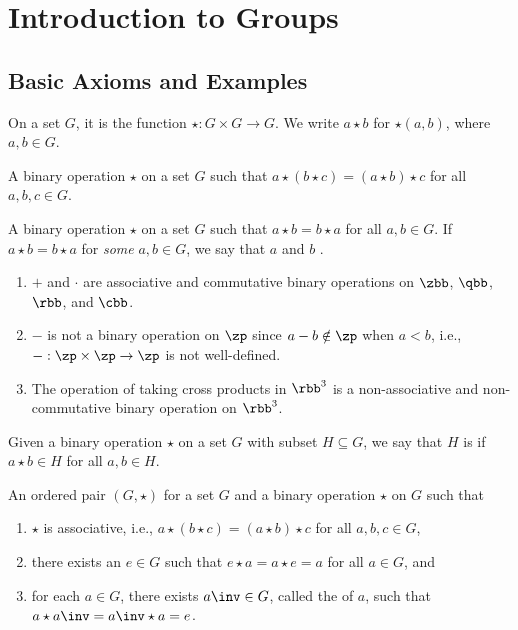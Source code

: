 \section{Introduction to Groups}

\subsection{Basic Axioms and Examples}

\begin{groupdef}
     On a set $G$, it is the function $\star : G \times G \to G$. We write $a \star b$ for $\star(a, b)$, where $a, b \in G$.

     A binary operation $\star$ on a set $G$ such that $a \star (b \star c) = (a \star b) \star c$ for all $a, b, c \in G$.

     A binary operation $\star$ on a set $G$ such that $a \star b = b \star a$ for all $a, b \in G$.
    If $a \star b = b \star a$ for \emph{some} $a, b \in G$, we say that $a$ and $b$ .
\end{groupdef}

\begin{example}
    \begin{enumerate}
        \item $+$ and $\cdot$ are associative and commutative binary operations on $\zbb$, $\qbb$, $\rbb$, and $\cbb$.
        \item $-$ is not a binary operation on $\zp$ since $a - b \notin \zp$ when $a < b$, i.e., $- : \zp \times \zp \to \zp$ is not well-defined.
        \item The operation of taking cross products in $\rbb^3$ is a non-associative and non-commutative binary operation on $\rbb^3$.
    \end{enumerate}
\end{example}

 Given a binary operation $\star$ on a set $G$ with subset $H \subseteq G$, we say that $H$ is  if $a \star b \in H$ for all $a, b \in H$.

 An ordered pair $(G, \star)$ for a set $G$ and a binary operation $\star$ on $G$ such that
\begin{enumerate}
    \item $\star$ is associative, i.e., $a \star (b \star c) = (a \star b) \star c$ for all $a, b, c \in G$,
    \item there exists an  $e \in G$ such that $e \star a = a \star e = a$ for all $a \in G$, and
    \item for each $a \in G$, there exists $a\inv \in G$, called the  of $a$, such that $a \star a\inv = a\inv \star a = e$.
\end{enumerate}

